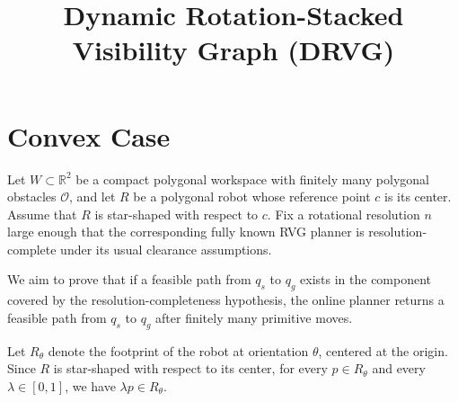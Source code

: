 \documentclass[letterpaper,11pt]{article}
\title{Dynamic Rotation-Stacked Visibility Graph (DRVG)}
\author{}
\date{}
\newcommand{\R}{\mathbb{R}}
\newcommand{\Obs}{\mathcal{O}}
\begin{document}
\maketitle

\begin{abstract}
\end{abstract}

\section{Convex Case}
Let \(W\subset \R^2\) be a compact polygonal workspace with finitely many
polygonal obstacles \(\Obs\), and let \(R\) be a polygonal robot whose reference
point \(c\) is its center. Assume that \(R\) is star-shaped with respect to
\(c\). Fix a rotational resolution \(n\) large enough that the corresponding
fully known RVG planner is resolution-complete under its usual clearance
assumptions.

We aim to prove that if a feasible path from \(q_s\) to \(q_g\) exists in the component covered
by the resolution-completeness hypothesis, the online planner returns a feasible
path from \(q_s\) to \(q_g\) after finitely many primitive moves.

Let $R_\theta$ denote the footprint of the robot at orientation $\theta$,
centered at the origin. Since $R$ is star-shaped with respect to its center,
for every $p\in R_\theta$ and every $\lambda\in[0,1]$, we have
$\lambda p\in R_\theta$.
\end{document}
